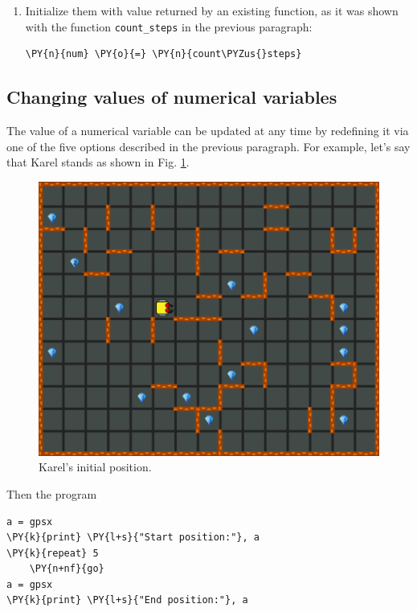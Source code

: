 \begin{enumerate}
\noindent
\item Initialize them with value returned by an existing function, as it was shown 
with the function {\tt count\_steps} in the previous paragraph:\\

\begin{bbox}
\begin{Verbatim}[commandchars=\\\{\}]
\PY{n}{num} \PY{o}{=} \PY{n}{count\PYZus{}steps}
\end{Verbatim}
\end{bbox}
\end{enumerate}

\subsection[\ \ Changing values of numerical variables]{Changing values of numerical variables}

The value of a numerical variable can be updated at any time by redefining it via 
one of the five options described in the previous paragraph. For example, let's say that 
Karel stands as shown in Fig. \ref{fig:var1}.

\begin{figure}[!ht]
\begin{center}
\includegraphics[height=0.4\textwidth]{img/variables1.png}
\end{center}
\vspace{-4mm}
\caption{Karel's initial position.}
\label{fig:var1}
\end{figure}

\noindent
Then the program\\

\begin{bbox}
\begin{Verbatim}[commandchars=\\\{\}]
a = gpsx
\PY{k}{print} \PY{l+s}{"Start position:"}, a
\PY{k}{repeat} 5
    \PY{n+nf}{go}
a = gpsx 
\PY{k}{print} \PY{l+s}{"End position:"}, a
\end{Verbatim}
\end{bbox}
\vspace{6mm}

